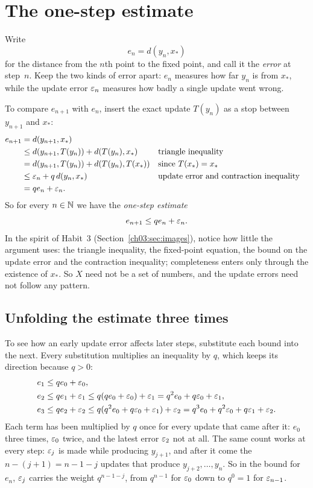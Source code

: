 \section{The one-step estimate}\label{ch18:sec:onestep}
Write
\[
 e_n=d(y_n,x_*)
\]
for the distance from the $n$th point to the fixed point, and call it the \emph{error} at step~$n$. Keep the two kinds of error apart: $e_n$ measures how far $y_n$ is from $x_*$, while the update error $\varepsilon_n$ measures how badly a single update went wrong.

To compare $e_{n+1}$ with $e_n$, insert the exact update $T(y_n)$ as a stop between $y_{n+1}$ and $x_*$:
\begin{align*}
 e_{n+1}
 &=d(y_{n+1},x_*)\\
 &\le d(y_{n+1},T(y_n))+d(T(y_n),x_*)
 &&\text{triangle inequality}\\
 &=d(y_{n+1},T(y_n))+d(T(y_n),T(x_*))
 &&\text{since $T(x_*)=x_*$}\\
 &\le\varepsilon_n+q\,d(y_n,x_*)
 &&\text{update error and contraction inequality}\\
 &=q e_n+\varepsilon_n.
\end{align*}
So for every $n\in\mathbb N$ we have the \emph{one-step estimate}
\[
 e_{n+1}\le qe_n+\varepsilon_n.
\]
In the spirit of Habit~3 (Section~\ref{ch03:sec:images}), notice how little the argument uses: the triangle inequality, the fixed-point equation, the bound on the update error and the contraction inequality; completeness enters only through the existence of $x_*$. So $X$ need not be a set of numbers, and the update errors need not follow any pattern.

\subsection*{Unfolding the estimate three times}
To see how an early update error affects later steps, substitute each bound into the next. Every substitution multiplies an inequality by $q$, which keeps its direction because $q>0$:
\begin{align*}
 e_1&\le qe_0+\varepsilon_0,\\
 e_2&\le qe_1+\varepsilon_1
       \le q(qe_0+\varepsilon_0)+\varepsilon_1
       =q^2e_0+q\varepsilon_0+\varepsilon_1,\\
 e_3&\le qe_2+\varepsilon_2
       \le q(q^2e_0+q\varepsilon_0+\varepsilon_1)+\varepsilon_2
       =q^3e_0+q^2\varepsilon_0+q\varepsilon_1+\varepsilon_2.
\end{align*}
Each term has been multiplied by $q$ once for every update that came after it: $e_0$ three times, $\varepsilon_0$ twice, and the latest error $\varepsilon_2$ not at all. The same count works at every step: $\varepsilon_j$ is made while producing $y_{j+1}$, and after it come the $n-(j+1)=n-1-j$ updates that produce $y_{j+2},\ldots,y_n$. So in the bound for $e_n$, $\varepsilon_j$ carries the weight $q^{n-1-j}$, from $q^{n-1}$ for $\varepsilon_0$ down to $q^0=1$ for $\varepsilon_{n-1}$.

